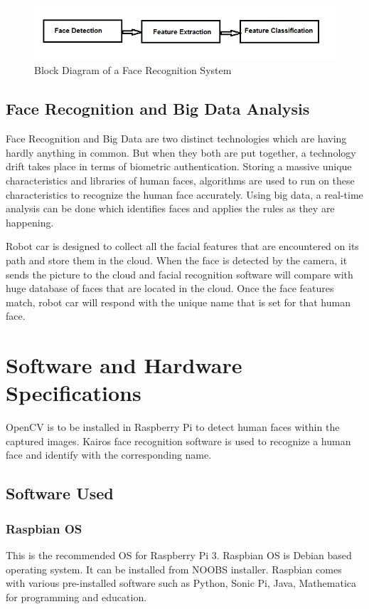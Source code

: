 \begin{figure}[!ht]
  \centering
  \includegraphics[width=\columnwidth]{images/Face-recognition.jpg}
  \caption{Block Diagram of a Face Recognition System}
\end{figure}

\subsection{Face Recognition and Big Data Analysis}

Face Recognition and Big Data are two distinct technologies which are 
having hardly anything in common. But when they both are put together, 
a technology drift takes place in terms of biometric authentication. 
Storing a massive unique characteristics and libraries of human faces, 
algorithms are used to run on these characteristics to recognize the 
human face accurately. Using big data, a real-time analysis can be done 
which identifies faces and applies the rules as they are happening.

Robot car is designed to collect all the facial features that are encountered 
on its path and store them in the cloud. When the face is detected by the 
camera, it sends the picture to the cloud and facial recognition software 
will compare with huge database of faces that are located in the cloud. 
Once the face features match, robot car will respond with the unique name 
that is set for that human face.

\section{Software and Hardware Specifications}
OpenCV is to be installed in Raspberry Pi to detect human faces within the 
captured images. Kairos face recognition software is used to recognize a 
human face and identify with the corresponding name.

\subsection{Software Used}

\subsubsection{Raspbian OS}
This is the recommended OS for Raspberry Pi 3. Raspbian OS is Debian based 
operating system. It can be installed from NOOBS installer. Raspbian comes 
with various pre-installed software such as Python, Sonic Pi, Java, 
Mathematica for programming and education.

